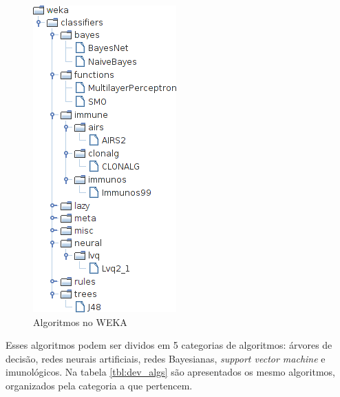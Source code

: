 \begin{figure}[h]
    \vspace{0.5cm}
    \centering
    \caption{Algoritmos no WEKA}
    \label{fig:dev_weka_algos}
    \vspace{0.5cm}
    \includegraphics[height=0.5\textheight]{img/weka_algos_cropped.png}
    \vspace{0.5cm}
\end{figure}

Esses algoritmos podem ser dividos em 5 categorias de algoritmos: árvores de decisão, redes neurais artificiais, redes Bayesianas, \emph{support vector machine} e imunológicos. Na tabela \ref{tbl:dev_algs} são apresentados os mesmo algoritmos, organizados pela categoria a que pertencem.

